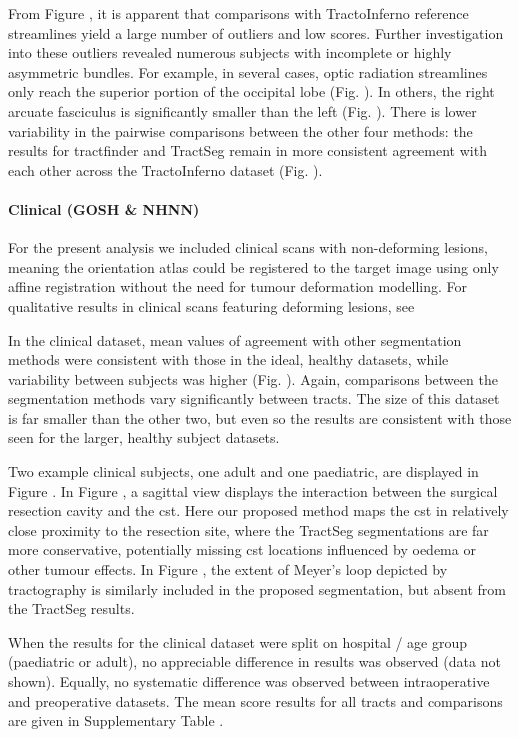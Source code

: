 From Figure , it is apparent that comparisons with TractoInferno reference streamlines yield a large number of outliers and low scores.
Further investigation into these outliers revealed numerous subjects with incomplete or highly asymmetric bundles.
For example, in several cases, optic radiation streamlines only reach the superior portion of the occipital lobe (Fig. ).
In others, the right arcuate fasciculus is significantly smaller than the left (Fig. ).
There is lower variability in the pairwise comparisons between the other four methods: the results for tractfinder and TractSeg remain in more consistent agreement with each other across the TractoInferno dataset (Fig. ).

\paragraph*{Clinical (GOSH \& NHNN)}

For the present analysis we included clinical scans with non-deforming lesions, meaning the orientation atlas could be registered to the target image using only affine registration without the need for tumour deformation modelling.
For qualitative results in clinical scans featuring deforming lesions, see \textcite{Young2022}

In the clinical dataset, mean values of agreement with other segmentation methods were consistent with those in the ideal, healthy datasets, while variability between subjects was higher (Fig. ).
Again, comparisons between the segmentation methods vary significantly between tracts.
The size of this dataset is far smaller than the other two, but even so the results are consistent with those seen for the larger, healthy subject datasets.

Two example clinical subjects, one adult and one paediatric, are displayed in Figure .
In Figure , a sagittal view displays the interaction between the surgical resection cavity and the \gls{cst}.
Here our proposed method maps the \gls{cst} in relatively close proximity to the resection site, where the TractSeg segmentations are far more conservative, potentially missing \gls{cst} locations influenced by oedema or other tumour effects.
In Figure , the extent of Meyer's loop depicted by tractography is similarly included in the proposed segmentation, but absent from the TractSeg results.

When the results for the clinical dataset were split on hospital / age group (paediatric or adult), no appreciable difference in results was observed (data not shown).
Equally, no systematic difference was observed between intraoperative and preoperative datasets.
The mean score results for all tracts and comparisons are given in Supplementary Table .


